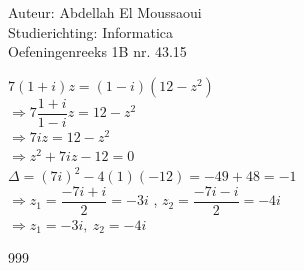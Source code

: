 \documentclass[a4paper]{article}
\begin{document}
  
\noindent \large Auteur: Abdellah El Moussaoui \\
\noindent \large Studierichting: Informatica\\
\noindent \large Oefeningenreeks 1B nr. 43.15\\

\medskip

\normalsize

\medskip

$7(1+i)z=(1-i)(12-z^2)$\\

$\Rightarrow 7\dfrac{1+i}{1-i}z=12-z^2$\\

$\Rightarrow 7iz=12-z^2$\\

$\Rightarrow z^2+7iz-12=0$\\

$\Delta=(7i)^2-4(1)(-12)=-49+48=-1$\\

$\Rightarrow z_1=\dfrac{-7i+i}{2}=-3i$ , $z_2=\dfrac{-7i-i}{2}=-4i$\\

$\Rightarrow z_1=-3i,\ z_2=-4i$\\

\begin{thebibliography}{999}
\end{thebibliography}
\end{document}
